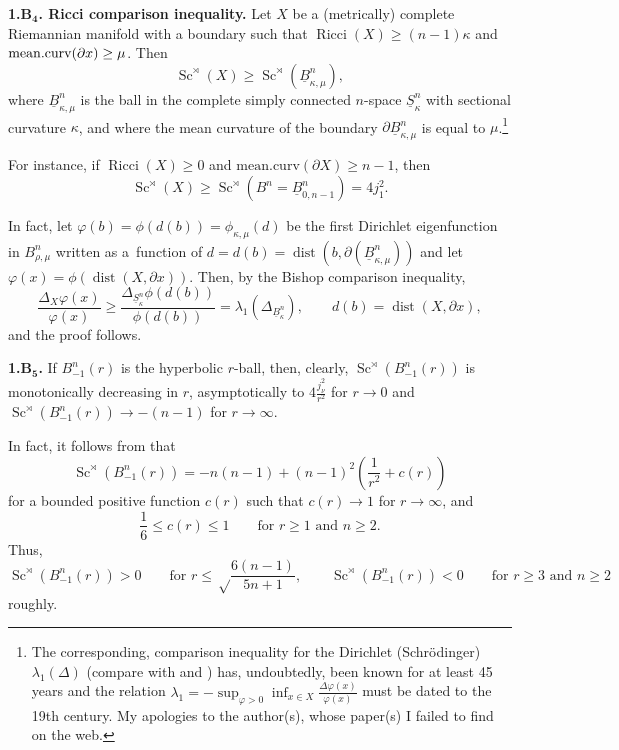 \documentclass[10pt,a4paper]{amsart}
\numberwithin{equation}{section}
\begin{document}
 \textbf{1.B$\boldsymbol{{}_4}$. Ricci comparison inequality.} Let $X$ be a (metrically) complete Riemannian mani\-fold with a boundary
 such that $\operatorname{Ricci}(X)\geq (n-1)\kappa$
 and ${\rm mean.curv}(\partial x)\geq \mu$.
Then
\[
\operatorname{Sc}^{\rtimes}(X)\geq \operatorname{Sc}^\rtimes(\underline B^n_{\kappa, \mu}),
\]
where $\underline B^n_{\kappa, \mu}$ is the ball in the complete simply connected $n$-space
$\underline S^n_\kappa$ with sectional curvature
$\kappa$, and where the mean curvature of the boundary $\partial \underline B^n_{\kappa, \mu}$ is equal to $\mu$.\footnote{The corresponding, comparison inequality for the Dirichlet (Schr\"odinger) $\lambda_1(\Delta)$ (compare with \cite{CF1974} and \cite{BF2017})
has, undoubtedly, been known for at least 45 years and the relation
$\lambda_1=-\sup_{\varphi>0}\inf_{x\in X} \frac {\Delta\varphi(x)}{\varphi(x)}$ must be dated to
the 19th century. My apologies to the author(s), whose paper(s) I failed to find on the web.}

For instance,  if $\operatorname{Ricci}(X)\geq 0$ and $\mathrm{mean.curv}(\partial X)\geq n-1$, then
\[
\operatorname{Sc}^{\rtimes}(X)\geq \operatorname{Sc}^\rtimes( B^n=\underline B^n_{0,n-1})=4j_1^2.
\]

In fact, let $\varphi(b) =\phi(d(b))=\phi_{\kappa, \mu}(d)$ be the first Dirichlet eigenfunction in $B^n_{\rho, \mu}$ written as
a~function of $d=d(b)=\operatorname{dist}(b, \partial (\underline B^n_{\kappa, \mu}))$ and let
$\varphi(x)=\phi(\operatorname{dist}(X, \partial x))$. Then, by the Bishop comparison inequality,
\[
\frac {\Delta_X\varphi(x)}{\varphi(x)}
\geq \frac {\Delta_{\underline S^n_\kappa}\phi(d(b))}{\phi(d(b))}=\lambda_1(\Delta_{\underline B^n_\kappa}),
\qquad
 d(b)=\operatorname{dist}(X,\partial x),
\]
and the proof follows.

 \textbf{1.B$\boldsymbol{{}_5}$.} If $ B_{-1}^n(r)$ is the hyperbolic $r$-ball,
 then, clearly, $ \operatorname{Sc}^\rtimes (B_{-1}^n(r))$ is monotonically decreasing in $r$, asymptotically to
 $4\frac {j_{\nu}^2}{r^2}$ for $r\to 0$ and $ \operatorname{Sc}^\rtimes (B_{-1}^n(r))\to -(n-1)$ for $r\to \infty$.

 In fact, it follows from \cite[Theorem~3.3]{BF2017} that
\[
\operatorname{Sc}^\rtimes (B_{-1}^n(r))=-n(n-1)+(n-1)^2\left (\frac {1}{r^2} +c(r)\right )
\]
 for a bounded positive function $c(r)$ such that $c(r)\to 1$ for $r\to \infty$, and
\[
 \frac {1}{6}\leq c(r)\leq 1 \qquad \text{for $r\geq 1$ and $n\geq 2$}.
 \]
 Thus,
\[
\operatorname{Sc}^\rtimes (B_{-1}^n(r))>0 \qquad \text{for
 $r\leq \sqrt \frac{6(n-1)}{5n+1}$}, \qquad   \operatorname{Sc}^\rtimes (B_{-1}^n(r))<0 \qquad \text{for $r\geq 3$ and $n\geq 2$}
 \]
roughly.
\end{document}
